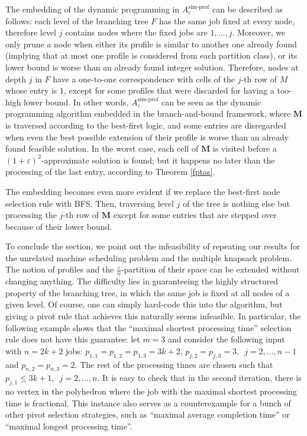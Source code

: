 \documentclass[moor,sglanonrev]{informs4}
\theoremstyle{plain}
\begin{document}
The embedding of the dynamic programming in $A^{\text{sim-prof}}_{\varepsilon}$ can be described as follows: each level of the branching tree $F$ has the same job fixed at every node, therefore level $j$ contains nodes where the fixed jobs are $1,\ldots, j$. Moreover, we only prune a node when either its profile is similar to another one already found (implying that at most one profile is considered from each partition class), or its lower bound is worse than an already found integer solution. Therefore, nodes at depth $j$ in $F$ have a one-to-one correspondence with cells of the $j$-th row of $M$ whose entry is $1$, except for some profiles that were discarded for having a too-high lower bound. In other words, $A^{\text{sim-prof}}_{\varepsilon}$ can be seen as the dynamic programming algorithm embedded in the branch-and-bound framework, where $\bm{M}$ is traversed according to the best-first logic, and some entries are disregarded when even the best possible extension of their profile is worse than an already found feasible solution. In the worst case, each cell of $\bm{M}$ is visited before a $(1+\varepsilon)^2$-approximate solution is found; but it happens no later than the processing of the last entry, according to Theorem \ref{fptas}.

The embedding becomes even more evident if we replace the best-first node selection rule with BFS. Then, traversing level $j$ of the tree is nothing else but processing the $j$-th row of $\bm{M}$ except for some entries that are stepped over because of their lower bound.

\bigskip

To conclude the section, we point out the infeasibility of repeating our results for the unrelated machine scheduling problem and the multiple knapsack problem. The notion of profiles and the $\frac{\varepsilon}{n}$-partition of their space can be extended without changing anything. The difficulty lies in guaranteeing the highly structured property of the branching tree, in which the same job is fixed at all nodes of a given level. Of course, one can simply hard-code this into the algorithm, but giving a pivot rule that achieves this naturally seems infeasible. In particular, the following example shows that the ``maximal shortest processing time'' selection rule does not have this guarantee: let $m = 3$ and consider the following input with $n=2k+2$ jobs: $p_{1,1} = p_{1,2}=p_{1,3} = 3k+2$, $p_{j,2} = p_{j,3} = 3, \,\,\, j= 2, \ldots, n-1$ and $p_{n,2} = p_{n,3} = 2$. The rest of the processing times are chosen such that $p_{j,1} \le 3k+1, \,\,\, j = 2, \ldots, n$. It is easy to check that in the second iteration, there is no vertex in the polyhedron where the job with the maximal shortest processing time is fractional. This instance also serves as a counterexample for a bunch of other pivot selection strategies, such as ``maximal average completion time'' or ``maximal longest processing time''.
\end{document}
